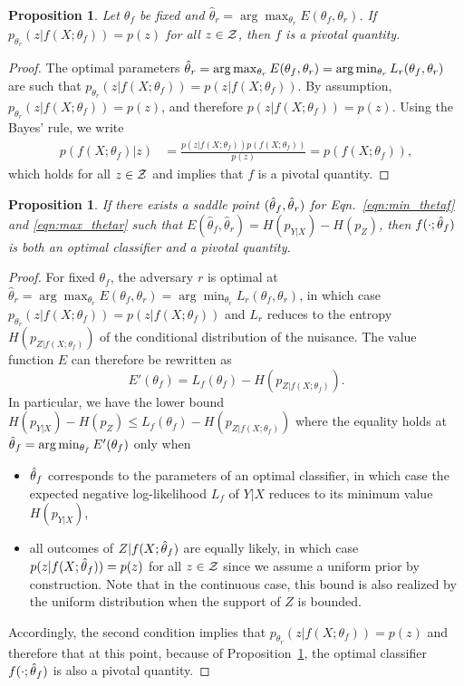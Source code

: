 \documentclass{article}
\theoremstyle{plain}
\newtheorem{proposition}[theorem]{Proposition}
\begin{document}
\begin{proposition}\label{prop:1}
Let $\theta_f$ be fixed and $\hat\theta_r = \arg \max_{\theta_r} E(\theta_f,
\theta_r)$. If $p_{\theta_r}(z|f(X;\theta_f)) = p(z)$
for all $z \in {\cal Z}$, then $f$ is a pivotal quantity.
\end{proposition}

\begin{proof}
The optimal parameters $\smash{\hat\theta}_r =
\arg \max_{\theta_r} E(\theta_f, \theta_r) = \arg \min_{\theta_r} L_r(\theta_f,
\theta_r)$ are such that $p_{\theta_r}(z|f(X;\theta_f)) = p(z|f(X;\theta_f))$.
By assumption, $p_{\theta_r}(z|f(X;\theta_f)) = p(z)$,
and therefore $p(z|f(X;\theta_f)) = p(z)$.
Using the Bayes' rule, we write
\begin{align*}
    p(f(X;\theta_f)|z) &= \frac{ p(z|f(X;\theta_f)) p(f(X;\theta_f)) } { p(z)} = p(f(X;\theta_f)),
\end{align*}
which holds for all $z \in {\cal Z}$ and implies that $f$ is a pivotal quantity.
\end{proof}

\begin{proposition}\label{prop:2}
If there exists a saddle point $(\smash{\hat\theta}_f, \smash{\hat\theta}_r)$
for Eqn.~\ref{eqn:min_thetaf} and \ref{eqn:max_thetar} such that
$E(\hat\theta_f, \hat\theta_r) = H(p_{Y|X}) - H(p_Z)$, then
$f(\cdot;\smash{\hat\theta}_f)$ is both an optimal classifier  and a pivotal quantity.
\end{proposition}

\begin{proof}
For fixed $\theta_f$, the adversary $r$ is optimal at $\hat\theta_r = \arg
\max_{\theta_r} E(\theta_f, \theta_r)  = \arg \min_{\theta_r} L_r(\theta_f,
\theta_r)$, in which case $p_{\theta_r}(z|f(X;\theta_f)) = p(z|f(X;\theta_f))$ and $L_r$ reduces to the entropy
$H(p_{Z|f(X;\theta_f)})$ of the conditional distribution of the nuisance. The
value function $E$ can therefore be rewritten as $$E'(\theta_f) = L_f(\theta_f) -
H(p_{Z|f(X;\theta_f)}).$$  In particular, we have the lower bound $H(p_{Y|X}) -
H(p_Z) \leq L_f(\theta_f) - H(p_{Z|f(X;\theta_f)})$ where the equality
holds at $\smash{\hat\theta}_f = \arg \min_{\theta_f} E'(\theta_f)$ only when
\begin{itemize}
    \item $\smash{\hat\theta}_f$ corresponds to
    the parameters of an optimal classifier, in which case the expected negative log-likelihood $L_f$ of $Y|X$
    reduces to its minimum value $H(p_{Y|X})$,
    \item all
   outcomes of $Z|f(X;\smash{\hat\theta}_f)$ are equally likely, in which case
   $p(z|f(X;\smash{\hat\theta}_f)) = p(z)$ for all $z \in {\cal
   Z}$ since we assume a uniform prior by construction. Note that in the continuous case, this bound is also realized
   by the uniform distribution when the support of $Z$ is bounded.
\end{itemize}
Accordingly, the second condition implies that $p_{\theta_r}(z|f(X;\theta_f)) = p(z)$ and therefore that at this
point, because of Proposition~\ref{prop:1}, the optimal classifier $f(\cdot;\smash{\hat\theta}_f)$ is also a pivotal quantity.
\end{proof}
\end{document}
